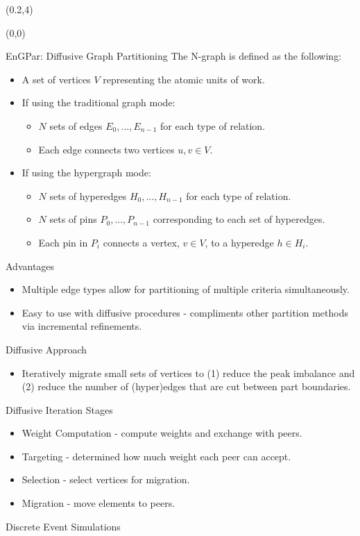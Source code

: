 \documentclass{beamer}
\begin{document}
      \begin{textblock}{15.6}(0.2,4)
        \begin{textblock}{5}(0,0)
          \begin{block}{EnGPar: Diffusive Graph Partitioning}
            The N-graph is defined as the following:
            \begin{itemize}
            \item A set of vertices $V$ representing the atomic units of work.
            \item If using the traditional graph mode:
              \begin{itemize}
              \item $N$ sets of edges $E_0,...,E_{n-1}$ for each type of relation.
              \item Each edge connects two vertices $u,v \in V$.
              \end{itemize}
            \item If using the hypergraph mode:
              \begin{itemize}
              \item $N$ sets of hyperedges $H_0,...,H_{n-1}$ for each type of relation.
              \item $N$ sets of pins $P_0,...,P_{n-1}$ corresponding to each set of hyperedges.
              \item Each pin in $P_i$ connects a vertex, $v \in V$, to a hyperedge $h \in H_i$.
              \end{itemize}
            \end{itemize}
            Advantages
            \begin{itemize}
            \item Multiple edge types allow for partitioning of multiple criteria simultaneously.
            \item Easy to use with diffusive procedures - compliments other partition methods via incremental refinements.
            \end{itemize}
            Diffusive Approach
            \begin{itemize}
            \item Iteratively migrate small sets of vertices to (1) reduce the peak imbalance and (2) reduce the number of (hyper)edges that are cut between part boundaries.
            \end{itemize}
            Diffusive Iteration Stages
            \begin{itemize}
            \item Weight Computation - compute weights and exchange with peers.
            \item Targeting - determined how much weight each peer can accept.
            \item Selection - select vertices for migration.
            \item Migration - move elements to peers.
            \end{itemize}
          \end{block}
          \begin{block}{Discrete Event Simulations}


\end{block}
\end{textblock}
\end{textblock}
\end{document}
